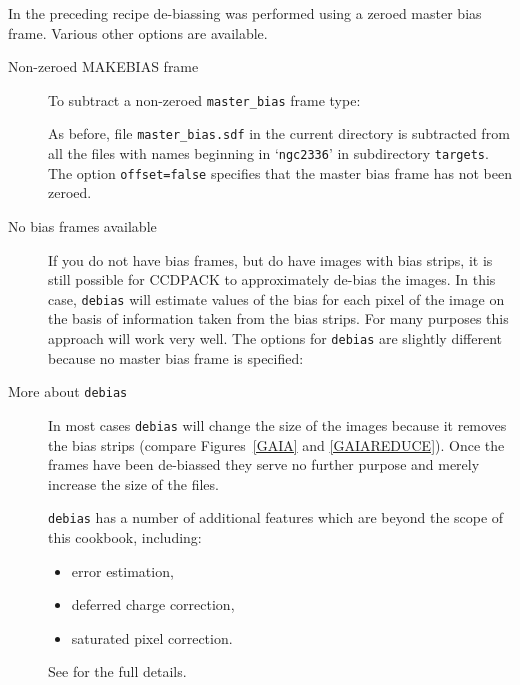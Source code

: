 \documentclass[twoside,11pt]{starlink}
\begin{document}
In the preceding recipe de-biassing was performed using a zeroed master
bias frame.  Various other options are available.

\begin{description}

  \item[Non-zeroed MAKEBIAS frame] To subtract a non-zeroed \texttt{master\_bias} frame type:

\begin{small}
\begin{terminalv}
\end{terminalv}
\end{small}

   As before, file \texttt{master\_bias.sdf} in the current directory is
   subtracted from all the files with names beginning in `\texttt{ngc2336}'
   in subdirectory \texttt{targets}.  The option \texttt{offset=false}
   specifies that the master bias frame has not been zeroed.

  \item[No bias frames available] If you do not have bias frames, but do
   have images with bias strips, it is still possible for CCDPACK to
   approximately de-bias the images.  In this case, \texttt{debias} will
   estimate values of the bias for each pixel of the image on the basis of
   information taken from the bias strips. For many purposes this approach
   will work very well.  The options for \texttt{debias} are slightly
   different because no master bias frame is specified:

\begin{terminalv}
\end{terminalv}

  \item[More about \texttt{debias}] In most cases \texttt{debias} will change
   the size of the images because it removes the bias strips (compare
   Figures~\ref{GAIA} and \ref{GAIAREDUCE}).  Once the frames have
   been de-biassed they serve no further purpose and merely increase
   the size of the files.

   \texttt{debias} has a number of additional features which are beyond the
   scope of this cookbook, including:

  \begin{itemize}

    \item error estimation,

    \item deferred charge correction,

    \item saturated pixel correction.

  \end{itemize}

   See \/\cite{SUN139} for the full details.

\end{description}
\end{document}
